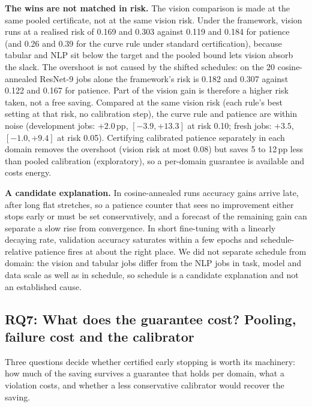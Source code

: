 \documentclass[3p,twocolumn,10pt]{elsarticle}
\theoremstyle{definition}
\begin{document}
\textbf{The wins are not matched in risk.} The vision comparison is made at the same pooled certificate, not at the same vision risk. Under the framework, vision runs at a realised risk of 0.169 and 0.303 against 0.119 and 0.184 for patience (and 0.26 and 0.39 for the curve rule under standard certification), because tabular and NLP sit below the target and the pooled bound lets vision absorb the slack. The overshoot is not caused by the shifted schedules: on the 20 cosine-annealed ResNet-9 jobs alone the framework's risk is 0.182 and 0.307 against 0.122 and 0.167 for patience. Part of the vision gain is therefore a higher risk taken, not a free saving. Compared at the same vision risk (each rule's best setting at that risk, no calibration step), the curve rule and patience are within noise (development jobs: $+2.0$\,pp, $[-3.9,+13.3]$ at risk 0.10; fresh jobs: $+3.5$, $[-1.0,+9.4]$ at risk 0.05). Certifying calibrated patience separately in each domain removes the overshoot (vision risk at most 0.08) but saves 5 to 12\,pp less than pooled calibration (exploratory), so a per-domain guarantee is available and costs energy.

\textbf{A candidate explanation.} In cosine-annealed runs accuracy gains arrive late, after long flat stretches, so a patience counter that sees no improvement either stops early or must be set conservatively, and a forecast of the remaining gain can separate a slow rise from convergence. In short fine-tuning with a linearly decaying rate, validation accuracy saturates within a few epochs and schedule-relative patience fires at about the right place. We did not separate schedule from domain: the vision and tabular jobs differ from the NLP jobs in task, model and data scale as well as in schedule, so schedule is a candidate explanation and not an established cause.

\subsection{RQ7: What does the guarantee cost? Pooling, failure cost and the calibrator}
\label{sec:cost}
Three questions decide whether certified early stopping is worth its machinery: how much of the saving survives a guarantee that holds per domain, what a violation costs, and whether a less conservative calibrator would recover the saving.
\end{document}
